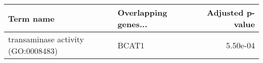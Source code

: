 \begin{tabular}{llr}
\toprule
                         Term name & Overlapping genes... &  Adjusted p-value \\
\midrule
transaminase activity (GO:0008483) &                BCAT1 &          5.50e-04 \\
\bottomrule
\end{tabular}
